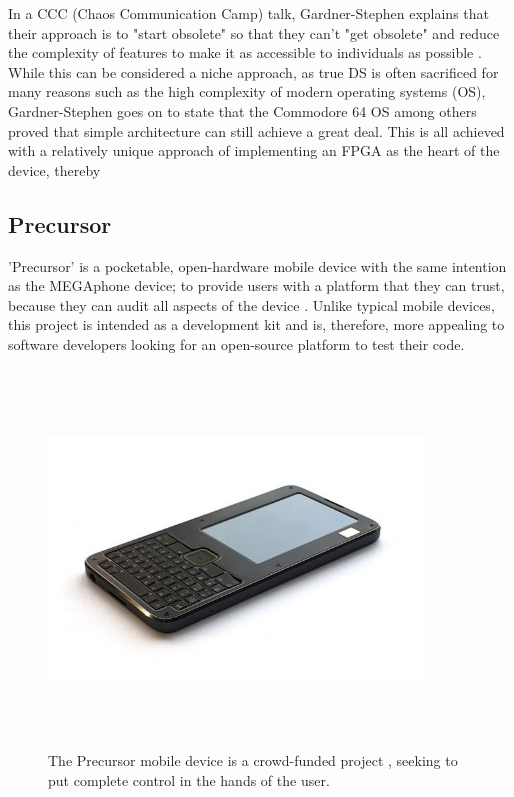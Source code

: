 In a CCC (Chaos Communication Camp) talk, Gardner-Stephen explains that their approach is to "start obsolete" so that they can't "get obsolete" and reduce the complexity of features to make it as accessible to individuals as possible \cite{mobilehistory}.
While this can be considered a niche approach, as true DS is often sacrificed for many reasons such as the high complexity of modern operating systems (OS), Gardner-Stephen goes on to state that the Commodore 64 OS among others proved that simple architecture can still achieve a great deal.
This is all achieved with a relatively unique approach of implementing an FPGA as the heart of the device, thereby 

\subsection{Precursor}

'Precursor' is a pocketable, open-hardware mobile device with the same intention as the MEGAphone device; to provide users with a platform that they can trust, because they can audit all aspects of the device \cite{precursor}.
Unlike typical mobile devices, this project is intended as a development kit and is, therefore, more appealing to software developers looking for an open-source platform to test their code.

\begin{figure} [h]
    \centering
    \includegraphics[width=10cm,height=10cm,keepaspectratio]{Figures/precursor.png}
    \caption{The Precursor mobile device is a crowd-funded project \cite{precursor}, seeking to put complete control in the hands of the user.}
    \label{fig:Precursor}
\end{figure}

